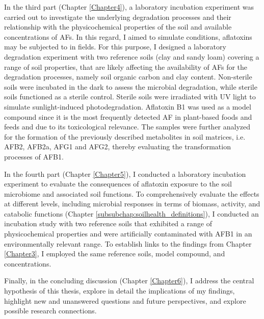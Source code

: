 In the third part (Chapter \ref{Chapter4}), a laboratory incubation experiment was carried out to investigate the underlying degradation processes and their relationship with the physicochemical properties of the soil and available concentrations of AFs. In this regard, I aimed to simulate conditions, aflatoxins may be subjected to in fields. For this purpose, I designed a laboratory degradation experiment with two reference soils (clay and sandy loam) covering a range of soil properties, that are likely affecting the availability of AFs for the degradation processes, namely soil organic carbon and clay content. Non-sterile soils were incubated in the dark to assess the microbial degradation, while sterile soils functioned as a sterile control. Sterile soils were irradiated with UV light to simulate sunlight-induced photodegradation. Aflatoxin B1 was used as a model compound since it is the most frequently detected AF in plant-based foods and feeds and due to its toxicological relevance. The samples were further analyzed for the formation of the previously described metabolites in soil matrices, i.e. AFB2, AFB2a, AFG1 and AFG2, thereby evaluating the transformation processes of AFB1.


In the fourth part (Chapter \ref{Chapter5}), I conducted a laboratory incubation experiment to evaluate the consequences of aflatoxin exposure to the soil microbiome and associated soil functions. To comprehensively evaluate the effects at different levels, including microbial responses in terms of biomass, activity, and catabolic functions (Chapter \ref{subsubchap:soilhealth_definitions}), I conducted an incubation study with two reference soils that exhibited a range of physicochemical properties and were artificially contaminated with AFB1 in an environmentally relevant range. To establish links to the findings from Chapter \ref{Chapter3}, I employed the same reference soils, model compound, and concentrations.


Finally, in the concluding discussion (Chapter \ref{Chapter6}), I address the central hypothesis of this thesis, explore in detail the implications of my findings, highlight new and unanswered questions and future perspectives, and explore possible research connections.

